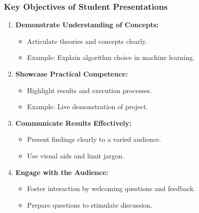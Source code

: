 \documentclass[aspectratio=169]{beamer}
\begin{document}
\begin{frame}[fragile]
    \frametitle{Key Objectives of Student Presentations}
    \begin{enumerate}
        \item \textbf{Demonstrate Understanding of Concepts:}
            \begin{itemize}
                \item Articulate theories and concepts clearly.
                \item Example: Explain algorithm choice in machine learning.
            \end{itemize}
        
        \item \textbf{Showcase Practical Competence:}
            \begin{itemize}
                \item Highlight results and execution processes.
                \item Example: Live demonstration of project.
            \end{itemize}

        \item \textbf{Communicate Results Effectively:}
            \begin{itemize}
                \item Present findings clearly to a varied audience.
                \item Use visual aids and limit jargon.
            \end{itemize}

        \item \textbf{Engage with the Audience:}
            \begin{itemize}
                \item Foster interaction by welcoming questions and feedback.
                \item Prepare questions to stimulate discussion.
            \end{itemize}
    \end{enumerate}
\end{frame}
\end{document}
